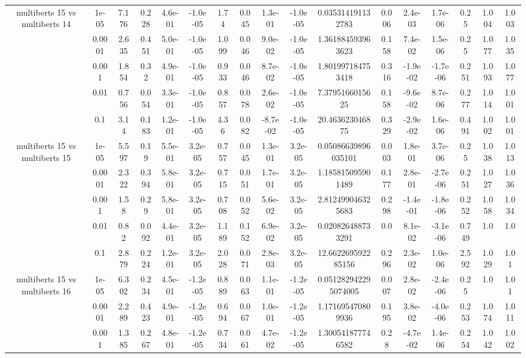 \begin{tabular}{|c|c|c|c|c|c|c|c|c|c|c|c|c|c|c|c|c|}
\hline
\multirow{5}{*}{multiberts 15 vs multiberts 14} & 1e-05 & 7.176 & 0.228 & 4.6e-01 & -1.0e-05 & 1.74 & 0.045 & 1.3e-01 & -1.0e-05 & 0.035314191132783 & 0.006 & 2.4e-03 & 1.7e-06 & 0.25 & 1.004 & 1.003 \\
 & 0.0001 & 2.635 & 0.451 & 5.0e-01 & -1.0e-05 & 1.099 & 0.046 & 9.0e-02 & -1.0e-05 & 1.361884593963623 & 0.158 & 7.4e-02 & 1.5e-06 & 0.25 & 1.077 & 1.035 \\
 & 0.001 & 1.854 & 0.32 & 4.9e-01 & -1.0e-05 & 0.933 & 0.046 & 8.7e-02 & -1.0e-05 & 1.801997184753418 & 0.316 & -1.9e-02 & -1.7e-06 & 0.251 & 1.093 & 1.077 \\
 & 0.01 & 0.756 & 0.054 & 3.3e-01 & -1.0e-05 & 0.857 & 0.078 & 2.6e-02 & -1.0e-05 & 7.3795166015625 & 0.158 & -9.6e-02 & 8.7e-06 & 0.277 & 1.014 & 1.001 \\
 & 0.1 & 3.14 & 0.183 & 1.2e-01 & -1.0e-05 & 4.36 & 0.082 & -8.7e-02 & -1.0e-05 & 20.463623046875 & 0.329 & -2.9e-02 & 1.6e-06 & 0.491 & 1.002 & 1.001 \\
\hline
\multirow{5}{*}{multiberts 15 vs multiberts 15} & 1e-05 & 5.597 & 0.19 & 5.5e-01 & 3.2e-05 & 0.757 & 0.045 & 1.3e-01 & 3.2e-05 & 0.05086639896035101 & 0.003 & 1.8e-01 & 3.7e-06 & 0.25 & 1.038 & 1.013 \\
 & 0.0001 & 2.322 & 0.394 & 5.8e-01 & 3.2e-05 & 0.715 & 0.051 & 1.7e-01 & 3.2e-05 & 1.185815095901489 & 0.177 & 2.8e-01 & -2.7e-06 & 0.251 & 1.027 & 1.036 \\
 & 0.001 & 1.58 & 0.29 & 5.8e-01 & 3.2e-05 & 0.708 & 0.052 & 5.6e-02 & 3.2e-05 & 2.812499046325683 & 0.298 & -1.4e-01 & -1.8e-06 & 0.252 & 1.058 & 1.034 \\
 & 0.01 & 0.82 & 0.092 & 4.4e-01 & 3.2e-05 & 1.189 & 0.152 & 6.9e-02 & 3.2e-05 & 0.020826488733291 & 0.0 & 8.1e-02 & -3.1e-06 & 0.749 & 1.0 & 1.0 \\
 & 0.1 & 2.879 & 0.224 & 1.2e-01 & 3.2e-05 & 2.028 & 0.071 & 2.8e-03 & 3.2e-05 & 12.662269592285156 & 0.296 & 2.3e-02 & 1.0e-06 & 2.592 & 1.029 & 1.01 \\
\hline
\multirow{5}{*}{multiberts 15 vs multiberts 16} & 1e-05 & 6.302 & 0.234 & 4.5e-01 & -1.2e-05 & 0.889 & 0.063 & 1.1e-01 & -1.2e-05 & 0.051282942295074005 & 0.007 & 2.8e-02 & -2.4e-06 & 0.25 & 1.0 & 1.01 \\
 & 0.0001 & 2.289 & 0.423 & 4.9e-01 & -1.2e-05 & 0.694 & 0.067 & 1.0e-01 & -1.2e-05 & 1.171695470809936 & 0.195 & 3.8e-02 & -4.0e-06 & 0.253 & 1.074 & 1.011 \\
 & 0.001 & 1.385 & 0.267 & 4.8e-01 & -1.2e-05 & 0.734 & 0.061 & 4.7e-02 & -1.2e-05 & 1.300541877746582 & 0.28 & -4.7e-02 & 1.4e-06 & 0.254 & 1.042 & 1.002 \\

\end{tabular}
